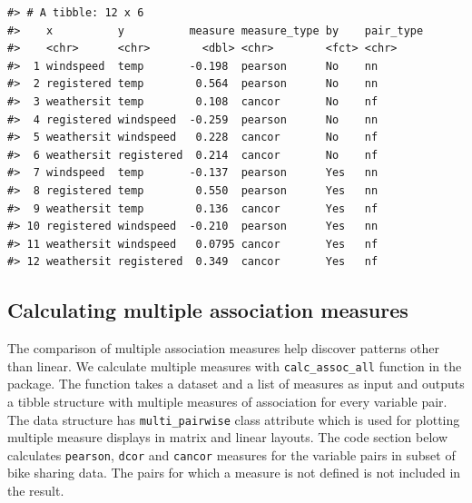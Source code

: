 \begin{verbatim}
#> # A tibble: 12 x 6
#>    x          y          measure measure_type by    pair_type
#>    <chr>      <chr>        <dbl> <chr>        <fct> <chr>    
#>  1 windspeed  temp       -0.198  pearson      No    nn       
#>  2 registered temp        0.564  pearson      No    nn       
#>  3 weathersit temp        0.108  cancor       No    nf       
#>  4 registered windspeed  -0.259  pearson      No    nn       
#>  5 weathersit windspeed   0.228  cancor       No    nf       
#>  6 weathersit registered  0.214  cancor       No    nf       
#>  7 windspeed  temp       -0.137  pearson      Yes   nn       
#>  8 registered temp        0.550  pearson      Yes   nn       
#>  9 weathersit temp        0.136  cancor       Yes   nf       
#> 10 registered windspeed  -0.210  pearson      Yes   nn       
#> 11 weathersit windspeed   0.0795 cancor       Yes   nf       
#> 12 weathersit registered  0.349  cancor       Yes   nf
\end{verbatim}

\hypertarget{calculating-multiple-association-measures}{%
\subsection{Calculating multiple association measures}\label{calculating-multiple-association-measures}}

The comparison of multiple association measures help discover patterns other than linear. We calculate multiple measures with \texttt{calc\_assoc\_all} function in the package. The function takes a dataset and a list of measures as input and outputs a tibble structure with multiple measures of association for every variable pair. The data structure has \texttt{multi\_pairwise} class attribute which is used for plotting multiple measure displays in matrix and linear layouts. The code section below calculates \texttt{pearson}, \texttt{dcor} and \texttt{cancor} measures for the variable pairs in subset of bike sharing data. The pairs for which a measure is not defined is not included in the result.

